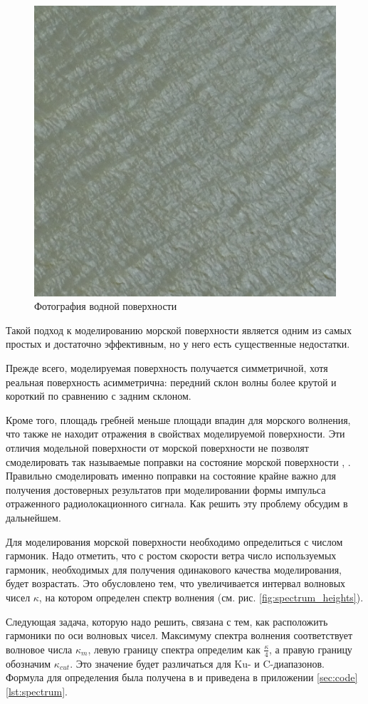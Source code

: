 \begin{figure}[h!]
    \centering
    \includegraphics[width=0.49\linewidth]{img/water_photo.png}
    \caption{Фотография водной поверхности}
    \label{fig:}
\end{figure}

Такой подход к моделированию морской поверхности является одним из самых простых и достаточно эффективным, но у него есть существенные недостатки.

Прежде всего, моделируемая поверхность получается симметричной, хотя реальная поверхность асимметрична: передний склон волны более крутой и короткий по сравнению с задним склоном.

Кроме того, площадь гребней меньше площади впадин для морского волнения, что
также не находит отражения в свойствах моделируемой поверхности. Эти отличия
модельной поверхности от морской поверхности не позволят смоделировать так
называемые поправки на состояние морской поверхности \cite{fu},
\cite{pustovoytenko}. 
Правильно смоделировать именно поправки на состояние крайне важно для получения
достоверных результатов при моделировании формы импульса
отраженного радиолокационного
сигнала. Как решить эту проблему обсудим в дальнейшем.


Для моделирования морской поверхности необходимо определиться с числом
гармоник. Надо отметить, что с ростом скорости ветра число используемых
гармоник, необходимых для получения одинакового качества моделирования, будет
возрастать. Это обусловлено тем, что увеличивается интервал волновых чисел
$\kappa$, на котором определен спектр волнения (см. рис.
\ref{fig:spectrum_heights}). 

Следующая задача, которую надо решить, связана с тем, как расположить гармоники
по оси волновых чисел. Максимуму спектра волнения соответствует волновое числа
$\kappa_m$, левую границу спектра определим как $\frac{\kappa}{4}$, а правую
границу обозначим $\kappa_{cut}$. Это значение будет различаться для Ku- и
C-диапазонов. Формула для определения была получена в \cite{karaev} и приведена  
в приложении \ref{sec:code} \ref{lst:spectrum}.


